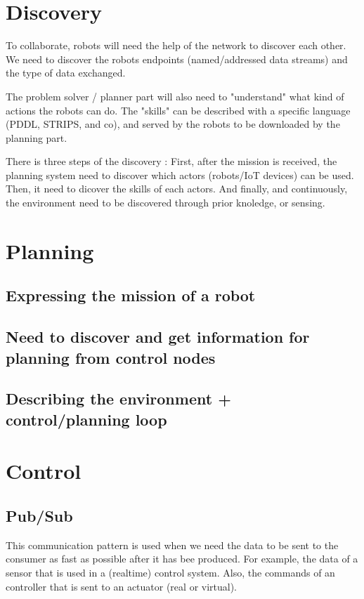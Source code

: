 \documentclass[conference]{IEEEtran}
\begin{document}
\section{Discovery}

To collaborate, robots will need the help of the network to discover each other.
We need to discover the robots endpoints (named/addressed data streams) and the type of data exchanged.

The problem solver / planner part will also need to "understand" what kind of actions the robots can do.
The "skills" can be described with a specific language (PDDL, STRIPS, and co), and served by the robots to be downloaded by the planning part.

There is three steps of the discovery : 
First, after the mission is received, the planning system need to discover which actors (robots/IoT devices) can be used.
Then, it need to dicover the skills of each actors.
And finally, and continuously, the environment need to be discovered through prior knoledge, or sensing.

\section{Planning}

\subsection{Expressing the mission of a robot}
\subsection{Need to discover and get information for planning from control nodes}
\subsection{Describing the environment + control/planning loop}

\section{Control}

\subsection{Pub/Sub}

This communication pattern is used when we need the data to be sent to the consumer as fast as possible after it has bee produced.
For example, the data of a sensor that is used in a (realtime) control system.
Also, the commands of an controller that is sent to an actuator (real or virtual).
\end{document}

